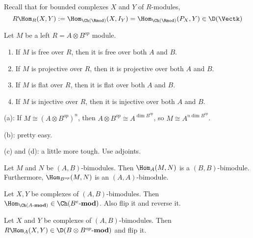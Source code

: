 \documentclass[12pt]{article}
\newcommand*{\Amod}{A\text{-}\mathbf{mod}}
\begin{document}
Recall that for bounded complexes $X$ and $Y$ of $R$-modules, 
\[R\Hom_R(X,Y):=\Hom_{\Ch(\Rmod)}(X,I_Y)=\Hom_{\Ch(\Rmod)}(P_X,Y)\in \D(\Vectk)\]
\begin{lem}
	Let $M$ be a left $R=A\otimes B^{op}$ module.
	\begin{enumerate}
		\item If $M$ is free over $R$, then it is free over both $A$ and $B$.
		\item If $M$ is projective over $R$, then it is projective over both $A$ and $B$.
		\item If $M$ is flat over $R$, then it is flat over both $A$ and $B$.
		\item If $M$ is injective over $R$, then it is injective over both $A$ and $B$.
	\end{enumerate}
\end{lem}
\begin{prf}
	(a): If $M\cong (A\otimes B^{op})^n$, then $A\otimes B^{op}\cong A^{\dim B^{op}}$, so $M\cong A^{n\dim B^{op}}$.

	(b): pretty easy.

	(c) and (d): a little more tough. Use adjoints.
\end{prf}
\begin{lem}
	Let $M$ and $N$ be $(A,B)$-bimodules. Then $\Hom_A(M,N)$ is a $(B,B)$-bimodule. Furthermore, $\Hom_{B^{op}}(M,N)$ is an $(A,A)$-bimodule.
\end{lem}
\begin{lem}
	Let $X,Y$ be complexes of $(A,B)$-bimodules. Then $\Hom_{\Ch(\Amod)}\in\Ch(B^e\text{-}\mathbf{mod})$.
	Also flip it and reverse it.
\end{lem}
\begin{lem}
	Let $X$ and $Y$ be complexes of $(A,B)$-bimodules. Then $R\Hom_A(X,Y)\in \D(B\otimes B^{op}\text{-}\mathbf{mod})$ and flip it.
\end{lem}
\end{document}

